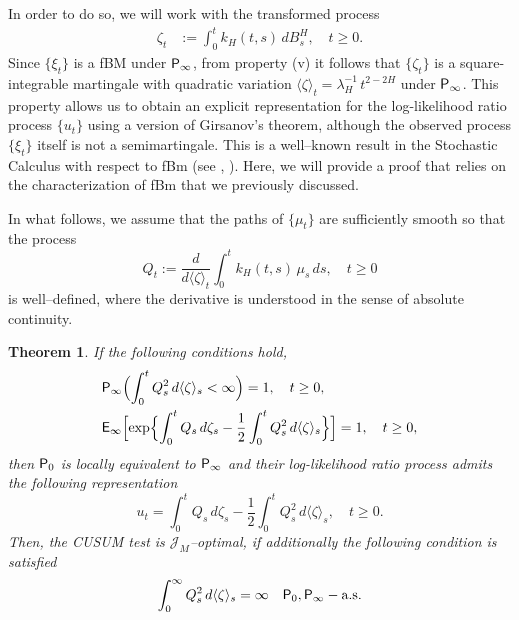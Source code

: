 \documentclass[11pt,reqno]{amsart}
\newtheorem{theorem}{Theorem}[section]
\theoremstyle{remark}
\begin{document}
In order to do so, we will work with the transformed process
\begin{align}  \label{ZZZ}
\zeta_{t} &:= \int_{0}^{t} k_{H}(t,s) \, dB^{H}_{s} , \quad t \geq 0.
\end{align}
Since $\{\xi_{t}\}$ is a fBM under ${{\sf P}}_{\infty}$, from property (v) it follows that $\{\zeta_{t}\}$ is a square-integrable martingale with quadratic variation  $\langle \zeta \rangle_{t}=  \lambda^{-1}_{H} \,  t^{2-2H}$ under ${{\sf P}}_{\infty}$. This property allows us to obtain an explicit representation for the log-likelihood ratio process $\{u_{t}\}$ using a version of Girsanov's theorem, although the observed process $\{\xi_{t}\}$ itself is not a semimartingale. 
This is a well--known result in the Stochastic Calculus with respect to fBm (see \cite{DU}, \cite{KLB3}). Here,  we will provide a  proof that relies on the 
characterization of fBm that we previously discussed. 

In what follows,  we assume that the paths of $\{\mu_{t}\}$ are sufficiently smooth so that the process
\begin{equation} \label{Q}
Q_{t}:= \frac{d}{d\langle \zeta\rangle_{t}}\int_{0}^{t}k_{H}(t,s) \, \mu_{s} \, ds, \quad t \geq 0
\end{equation}
is well--defined, where the derivative is understood in the sense of absolute continuity.

\begin{theorem} \label{main}
If the following conditions hold, 
\begin{align*}
& {{\sf P}}_{\infty} \Bigl( \int_{0}^{t} Q^{2}_{s} \, d\langle \zeta \rangle_{s} < \infty \Bigr)=1, \quad t \geq 0,   \\
& {{\sf E}}_{\infty} \Bigl[ \exp \Bigl\{  \int_{0}^{t} Q_{s} \, d\zeta_{s} - \frac{1}{2}  \int_{0}^{t} Q^{2}_{s} \, d\langle \zeta \rangle_{s} \Bigr\} \Bigr] =1, \quad t \geq 0,
\end{align*}
then ${{\sf P}}_0$ is locally equivalent to ${{\sf P}}_{\infty}$ and their log-likelihood ratio process admits the following representation
\begin{equation} \label{llrfbm2}  
u_{t}=  \int_{0}^{t} Q_{s} \, d\zeta_{s} - \frac{1}{2}  \int_{0}^{t} Q^{2}_{s} \, d\langle \zeta \rangle_{s} , \quad  t \geq 0.
\end{equation}
Then, the CUSUM test is ${\mathcal{J}}_{M}$--optimal, if additionally the following condition is satisfied
\begin{align} \label{fullQ}
\int_{0}^{\infty} Q_{s}^{2} \, d\langle \zeta \rangle_{s} = \infty \quad  {{\sf P}}_{0}, {{\sf P}}_{\infty}-\text{a.s.} 
\end{align}
\end{theorem}
\end{document}
